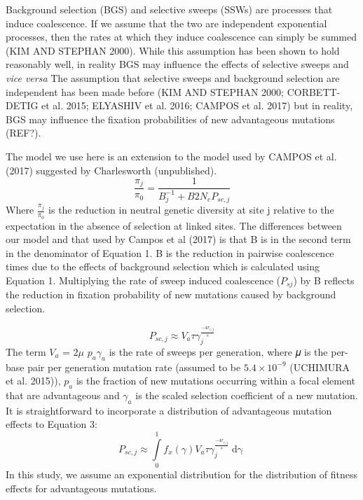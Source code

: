 \documentclass{article}
\begin{document}
	Background selection (BGS) and selective sweeps (SSWs) are processes that induce coalescence. If we assume that the two are independent exponential processes, then the rates at which they induce coalescence can simply be summed (KIM AND STEPHAN 2000). While this assumption has been shown to hold reasonably well, in reality BGS may influence the effects of selective sweeps and \emph{vice versa}
	The assumption that selective sweeps and background selection are independent has been made before (KIM AND STEPHAN 2000; CORBETT-DETIG et al. 2015; ELYASHIV et al. 2016; CAMPOS et al. 2017) but in reality, BGS may influence the fixation probabilities of new advantageous mutations (REF?). 

The model we use here is an extension to the model used by CAMPOS et al. (2017) suggested by Charlesworth (unpublished). 
\begin{equation}
\frac{\pi_{j}}{\pi_{0}} = \frac{1}{B_{j}^{-1}  + B2N_eP_{sc,j}}
\end{equation}
	Where \(\frac{\pi_{j}}{\pi_{0}}\) is the reduction in neutral genetic diversity at site j relative to the expectation in the absence of selection at linked sites. The differences between our model and that used by Campos et al (2017) is that B is in the second term in the denominator of Equation 1. B is the reduction in pairwise coalescence times due to the effects of background selection which is calculated using Equation 1. Multiplying the rate of sweep induced coalescence ($P_{sj}$) by B reflects the reduction in fixation probability of new mutations caused by background selection. 

\begin{equation}
P_{sc,j} \approx V_a \tau\gamma_j^{\frac{-4r_{i,j}}{s}} 
\end{equation}
The term $V_{a}$ = $2\mu$ $p_{a}\gamma_{a}$ is the rate of sweeps per generation, where 𝜇 is the per-base pair per generation mutation rate (assumed to be $5.4 \times 10^{-9}$ (UCHIMURA et al. 2015)), $p_a$ is the fraction of new mutations occurring within a focal element that are advantageous and $\gamma_a$  is the scaled selection coefficient of a new mutation. It is straightforward to incorporate a distribution of advantageous mutation effects to Equation 3:
		\begin{equation}
P_{sc,j} \approx \int \limits_{0}^{1} f_x(\gamma)   V_a \tau\gamma_j^{\frac{-4r_{i,j}}{s}} \mathop{d\gamma}
\end{equation}	
In this study, we assume an exponential distribution for the distribution of fitness effects for advantageous mutations. 
\end{document}
